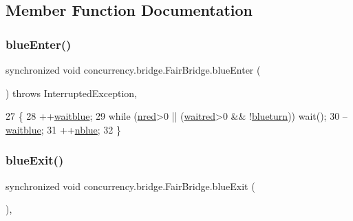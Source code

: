 \subsection{Member Function Documentation}
\mbox{\label{classconcurrency_1_1bridge_1_1_fair_bridge_a22e1d98bdcc46acd8750191b04e78a0a}} 
\subsubsection{\texorpdfstring{blue\+Enter()}{blueEnter()}}
{\footnotesize\ttfamily synchronized void concurrency.\+bridge.\+Fair\+Bridge.\+blue\+Enter (\begin{DoxyParamCaption}{ }\end{DoxyParamCaption}) throws Interrupted\+Exception\hspace{0.3cm}{\ttfamily [inline]}, {\ttfamily [package]}}


\begin{DoxyCode}
27                                                                \{
28         ++\mbox{\hyperlink{classconcurrency_1_1bridge_1_1_fair_bridge_a22597d8af11fb8d6799568ab8529b7db}{waitblue}};
29         \textcolor{keywordflow}{while} (\mbox{\hyperlink{classconcurrency_1_1bridge_1_1_fair_bridge_a858202569a7a17b2a613da82f56ce92a}{nred}}>0 || (\mbox{\hyperlink{classconcurrency_1_1bridge_1_1_fair_bridge_a8bb19943210b667898db6e363072741a}{waitred}}>0 && !\mbox{\hyperlink{classconcurrency_1_1bridge_1_1_fair_bridge_ab83efd0c4e3b7e9b16f57361e6f4826b}{blueturn}})) wait();
30         --\mbox{\hyperlink{classconcurrency_1_1bridge_1_1_fair_bridge_a22597d8af11fb8d6799568ab8529b7db}{waitblue}};
31         ++\mbox{\hyperlink{classconcurrency_1_1bridge_1_1_fair_bridge_a5af7f149ac3d495f24119357e9b52263}{nblue}};
32     \}
\end{DoxyCode}
\mbox{\label{classconcurrency_1_1bridge_1_1_fair_bridge_a1414fdd64a79f47dbb4aa384b3d3041f}} 
\subsubsection{\texorpdfstring{blue\+Exit()}{blueExit()}}
{\footnotesize\ttfamily synchronized void concurrency.\+bridge.\+Fair\+Bridge.\+blue\+Exit (\begin{DoxyParamCaption}{ }\end{DoxyParamCaption})\hspace{0.3cm}{\ttfamily [inline]}, {\ttfamily [package]}}


